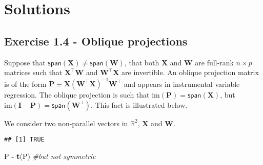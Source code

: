 \documentclass[]{book}
\newenvironment{Shaded}{\begin{snugshade}}{\end{snugshade}}
\newcommand{\CommentTok}[1]{\textcolor[rgb]{0.56,0.35,0.01}{\textit{#1}}}
\newcommand{\DecValTok}[1]{\textcolor[rgb]{0.00,0.00,0.81}{#1}}
\newcommand{\FloatTok}[1]{\textcolor[rgb]{0.00,0.00,0.81}{#1}}
\newcommand{\KeywordTok}[1]{\textcolor[rgb]{0.13,0.29,0.53}{\textbf{#1}}}
\newcommand{\NormalTok}[1]{#1}
\newcommand{\OperatorTok}[1]{\textcolor[rgb]{0.81,0.36,0.00}{\textbf{#1}}}
\newcommand{\StringTok}[1]{\textcolor[rgb]{0.31,0.60,0.02}{#1}}
\theoremstyle{definition}
\theoremstyle{definition}
\theoremstyle{definition}
\theoremstyle{remark}
\begin{document}
\hypertarget{solutions}{%
\section{Solutions}\label{solutions}}

\hypertarget{exercise-1.4---oblique-projections}{%
\subsection{Exercise 1.4 - Oblique projections}\label{exercise-1.4---oblique-projections}}

Suppose that \(\mathsf{span}(\mathbf{X}) \neq \mathsf{span}(\mathbf{W})\), that both \(\mathbf{X}\) and \(\mathbf{W}\) are full-rank \(n \times p\) matrices such that \(\mathbf{X}^\top\mathbf{W}\) and \(\mathbf{W}^\top\mathbf{X}\) are invertible. An oblique projection matrix is of the form \(\mathbf{P}\equiv\mathbf{X}(\mathbf{W}^\top\mathbf{X})^{-1}\mathbf{W}^\top\) and appears in instrumental variable regression. The oblique projection is such that \(\mathrm{im}(\mathbf{P})=\mathsf{span}(\mathbf{X})\), but \(\mathrm{im}(\mathbf{I}-\mathbf{P})=\mathsf{span}(\mathbf{W}^\perp)\). This fact is illustrated below.

We consider two non-parallel vectors in \(\mathbb{R}^2\), \(\mathbf{X}\) and \(\mathbf{W}\).

\begin{Shaded}
\end{Shaded}

\begin{verbatim}
## [1] TRUE
\end{verbatim}

\begin{Shaded}
\begin{Highlighting}[]
\NormalTok{P }\OperatorTok{-}\StringTok{ }\KeywordTok{t}\NormalTok{(P) }\CommentTok{#but not symmetric}
\end{Highlighting}
\end{Shaded}
\end{document}
